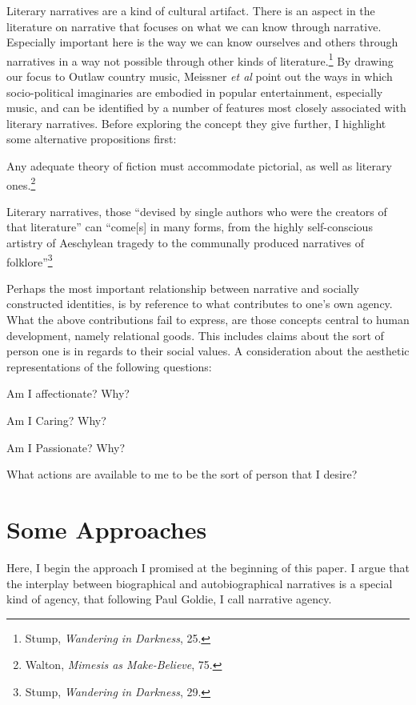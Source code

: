 \documentclass[phdthesis,12pt,final,a4paper]{wuthesis}
\theoremstyle{definition}
\theoremstyle{definition}
\theoremstyle{definition}
\theoremstyle{definition}
\theoremstyle{remark}
\begin{document}
Literary narratives are a kind of cultural artifact. There is an aspect in the literature on narrative that focuses on what we can know through narrative. Especially important here is the way we can know ourselves and others through narratives in a way not possible through other kinds of literature.\footnote{Stump, \emph{Wandering in {Darkness}}, 25.} By drawing our focus to Outlaw country music, Meissner \emph{et al} point out the ways in which socio-political imaginaries are embodied in popular entertainment, especially music, and can be identified by a number of features most closely associated with literary narratives. Before exploring the concept they give further, I highlight some alternative propositions first:

Any adequate theory of fiction must accommodate pictorial, as well as literary ones.\footnote{Walton, \emph{Mimesis as {Make-Believe}}, 75.}

Literary narratives, those ``devised by single authors who were the creators of that literature'' can ``come{[}s{]} in many forms, from the highly self-conscious artistry of Aeschylean tragedy to the communally produced narratives of folklore''\footnote{Stump, \emph{Wandering in {Darkness}}, 29.}

Perhaps the most important relationship between narrative and socially constructed identities, is by reference to what contributes to one's own agency. What the above contributions fail to express, are those concepts central to human development, namely relational goods. This includes claims about the sort of person one is in regards to their social values. A consideration about the aesthetic representations of the following questions:

Am I affectionate? Why?

Am I Caring? Why?

Am I Passionate? Why?

What actions are available to me to be the sort of person that I desire?

\section{Some Approaches}\label{some-approaches}

Here, I begin the approach I promised at the beginning of this paper. I argue that the interplay between biographical and autobiographical narratives is a special kind of agency, that following Paul Goldie, I call narrative agency.
\end{document}
